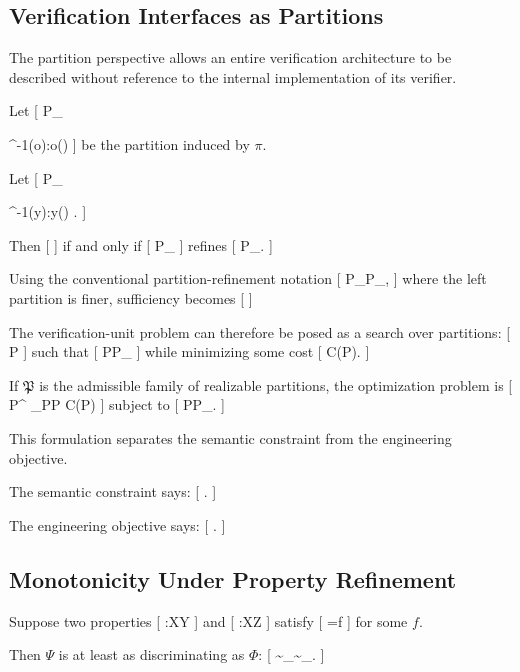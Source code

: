 \documentclass[11pt]{article}
\begin{document}
\subsection{Verification Interfaces as Partitions}

The partition perspective allows an entire verification architecture to be described without reference to the internal implementation of its verifier.

Let
[
\mathcal P_\pi

{
\pi^{-1}(o):o\in\Img(\pi)
}
]
be the partition induced by $\pi$.

Let
[
\mathcal P_\Phi

{
\Phi^{-1}(y):y\in\Img(\Phi)
}.
]

Then
[
\pi{}\Phi
]
if and only if
[
\mathcal P_\pi
]
refines
[
\mathcal P_\Phi.
]

Using the conventional partition-refinement notation
[
\mathcal P_\pi\preceq\mathcal P_\Phi,
]
where the left partition is finer, sufficiency becomes
[
]

The verification-unit problem can therefore be posed as a search over partitions:
[
\mathcal P
]
such that
[
\mathcal P\preceq\mathcal P_\Phi
]
while minimizing some cost
[
C(\mathcal P).
]

If $\mathfrak P$ is the admissible family of realizable partitions, the optimization problem is
[
\mathcal P^\star
\in
\arg\min_{\mathcal P\in\mathfrak P}
C(\mathcal P)
]
subject to
[
\mathcal P\preceq\mathcal P_\Phi.
]

This formulation separates the semantic constraint from the engineering objective.

The semantic constraint says:
[
.
]

The engineering objective says:
[
.
]

\subsection{Monotonicity Under Property Refinement}

Suppose two properties
[
\Phi:\mathcal X\to\mathcal Y
]
and
[
\Psi:\mathcal X\to\mathcal Z
]
satisfy
[
\Phi=f\circ\Psi
]
for some $f$.

Then $\Psi$ is at least as discriminating as $\Phi$:
[
\sim_\Psi\subseteq\sim_\Phi.
]
\end{document}
